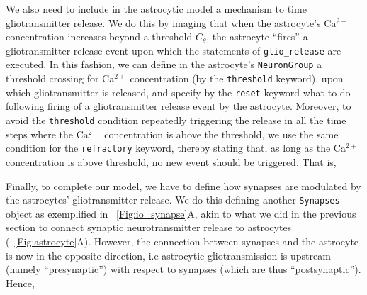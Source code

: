 \documentclass[a4paper, 11pt]{article}
\newcommand*{\figref}[1]{\figurename~\ref{#1}}
\begin{document}
We also need to include in the astrocytic model a mechanism to time gliotransmitter release.
 We do this by imaging that when the astrocyte's Ca$^{2+}$ concentration increases beyond a threshold $C_\theta$, the astrocyte ``fires'' a gliotransmitter release event upon which the statements of \lstinline|glio_release| are executed.
 In this fashion, we can define in the astrocyte's \lstinline|NeuronGroup| a threshold crossing for Ca$^{2+}$ concentration (by the \lstinline|threshold| keyword), upon which gliotransmitter is released, and specify by the \lstinline|reset| keyword what to do following firing of a gliotransmitter release event by the astrocyte.
 Moreover, to avoid the \lstinline|threshold| condition repeatedly triggering the release in all the time steps where the Ca$^{2+}$ concentration is above the threshold, we use the same condition for the \lstinline|refractory| keyword, thereby stating that, as long as the Ca$^{2+}$ concentration is above threshold, no new event should be triggered.
 That is,


Finally, to complete our model, we have to define how synapses are modulated by the astrocytes' gliotransmitter release.
We do this defining another \lstinline|Synapses| object as exemplified in \figref{Fig:io_synapse}A, akin to what we did in the previous section to connect synaptic neurotransmitter release to astrocytes (\figref{Fig:astrocyte}A). 
However, the connection between synapses and the astrocyte is now in the opposite direction, i.e astrocytic gliotransmission is upstream (namely ``presynaptic'') with respect to synapses (which are thus ``postsynaptic''). Hence,

\end{document}
